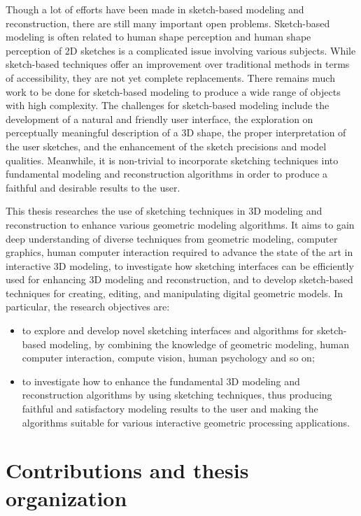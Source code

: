 Though a lot of efforts have been made in sketch-based modeling and
reconstruction, there are still many important open problems.
Sketch-based modeling is often related to human shape perception and
human shape perception of 2D sketches is a complicated issue
involving various subjects. While sketch-based techniques offer an
improvement over traditional methods in terms of accessibility, they
are not yet complete replacements. There remains much work to be
done for sketch-based modeling  to produce a wide range of objects
with high complexity. The challenges for sketch-based modeling
include the development of a natural and friendly user interface,
the exploration on perceptually meaningful description of a 3D
shape, the proper interpretation of the user sketches, and the
enhancement of the sketch precisions and model qualities. Meanwhile,
it is non-trivial to incorporate sketching techniques into
fundamental modeling and reconstruction algorithms in order to
produce a faithful and desirable results to the user.


This thesis researches the use  of sketching techniques in 3D
modeling and reconstruction to enhance various geometric modeling
algorithms. It aims to gain deep understanding of diverse techniques
from geometric modeling, computer graphics, human computer
interaction required to advance the state of the art in interactive
3D modeling, to investigate how sketching interfaces can be
efficiently used for enhancing 3D modeling and reconstruction, and
to develop sketch-based techniques for creating, editing, and
manipulating digital geometric models. In particular, the research
objectives are:
\begin{itemize}
\item to explore and develop novel sketching interfaces and
algorithms for sketch-based modeling, by combining the knowledge of
geometric modeling, human computer interaction, compute vision, human psychology and so on;

\item to investigate how to enhance the fundamental 3D modeling and reconstruction
algorithms by using sketching techniques, thus producing faithful
and satisfactory modeling results to the user and making the
algorithms suitable for various interactive geometric
 processing applications.
\end{itemize}


\section{Contributions and thesis organization}


